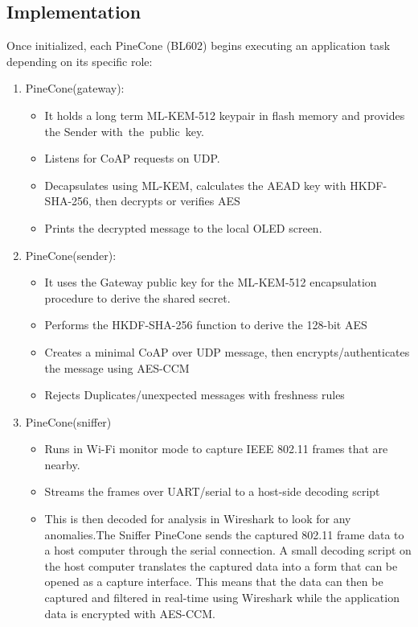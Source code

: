 \documentclass[a4paper]{scrartcl}
\begin{document}
    \subsection{Implementation}
    Once initialized, each PineCone (BL602) begins executing an application task depending on its specific role:
    \begin{enumerate}
    
    \item PineCone(gateway):
    
    \begin{itemize}
    \item It holds a long term ML-KEM-512 keypair in flash memory and provides the Sender with the public key.
    \item Listens for CoAP requests on UDP.
    \item Decapsulates using ML-KEM, calculates the AEAD key with HKDF-SHA-256, then decrypts or verifies AES
    \item Prints the decrypted message to the local OLED screen.
    \end{itemize}

    \item PineCone(sender):

    \begin{itemize}
        \item It uses the Gateway public key for the ML-KEM-512 encapsulation procedure to derive the shared secret.

        \item Performs the HKDF-SHA-256 function to derive the 128-bit AES

        \item Creates a minimal CoAP over UDP message, then encrypts/authenticates the message using AES-CCM

        \item Rejects Duplicates/unexpected messages with freshness rules

    \end{itemize}

    \item PineCone(sniffer)

    \begin{itemize}
        \item Runs in Wi-Fi monitor mode to capture IEEE 802.11 frames that are nearby.
        
        \item Streams the frames over UART/serial to a host-side decoding script

        \item This is then decoded for analysis in Wireshark to look for any anomalies.The Sniffer PineCone sends the captured 802.11 frame data to a host computer through the serial connection. A small decoding script on the host computer translates the captured data into a form that can be opened as a capture interface. This means that the data can then be captured and filtered in real-time using Wireshark while the application data is encrypted with AES-CCM. 
    \end{itemize}

    \end{enumerate}
\end{document}
